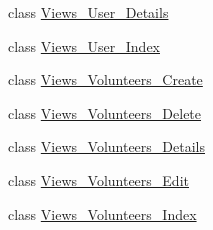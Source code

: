 \begin{DoxyCompactItemize}
\item 
class \mbox{\hyperlink{class_asp_net_core_1_1_views___user___details}{Views\+\_\+\+User\+\_\+\+Details}}
\item 
class \mbox{\hyperlink{class_asp_net_core_1_1_views___user___index}{Views\+\_\+\+User\+\_\+\+Index}}
\item 
class \mbox{\hyperlink{class_asp_net_core_1_1_views___volunteers___create}{Views\+\_\+\+Volunteers\+\_\+\+Create}}
\item 
class \mbox{\hyperlink{class_asp_net_core_1_1_views___volunteers___delete}{Views\+\_\+\+Volunteers\+\_\+\+Delete}}
\item 
class \mbox{\hyperlink{class_asp_net_core_1_1_views___volunteers___details}{Views\+\_\+\+Volunteers\+\_\+\+Details}}
\item 
class \mbox{\hyperlink{class_asp_net_core_1_1_views___volunteers___edit}{Views\+\_\+\+Volunteers\+\_\+\+Edit}}
\item 
class \mbox{\hyperlink{class_asp_net_core_1_1_views___volunteers___index}{Views\+\_\+\+Volunteers\+\_\+\+Index}}
\end{DoxyCompactItemize}

